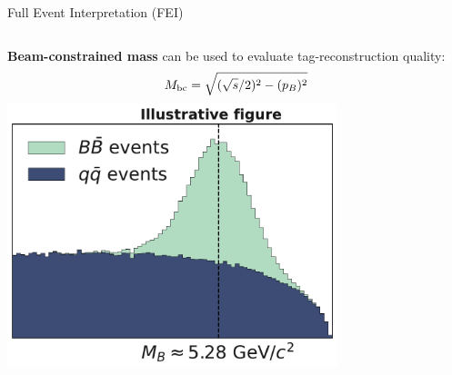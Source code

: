 \documentclass[xcolor=dvipsnames]{beamer}
\begin{document}
\begin{frame}{Full Event Interpretation (FEI)}
\vspace{10pt}

\begin{columns}
   \centering
   \textbf{Beam-constrained mass} can be used to evaluate tag-reconstruction quality:
   \vspace{-5pt}
   \begin{equation*}
   {\ensuremath{M_{\mathrm{bc}}}} = \sqrt{(\sqrt{s}/2)^2 - (p_B)^2}
   \end{equation*}
   \centering
   \includegraphics[width=0.72\textwidth]{figures/Mbc_mock_figure.pdf}
\end{columns}



\end{frame}
\end{document}
